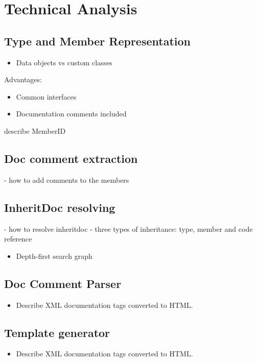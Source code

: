 
\chapter{Technical Analysis}

\section{Type and Member Representation}
\begin{itemize}
    \item Data objects vs custom classes
\end{itemize}
Advantages:
\begin{itemize}
    \item Common interfaces
    \item Documentation comments included
\end{itemize}

describe MemberID

\section{Doc comment extraction}

- how to add comments to the members

\section{InheritDoc resolving}

- how to resolve inheritdoc
- three types of inheritance: type, member and code reference

\begin{itemize}
    \item Depth-first search graph
\end{itemize}

\section{Doc Comment Parser}
\begin{itemize}
    \item Describe XML documentation tags converted to HTML.
\end{itemize}

\section{Template generator}
\begin{itemize}
    \item Describe XML documentation tags converted to HTML.
\end{itemize}

